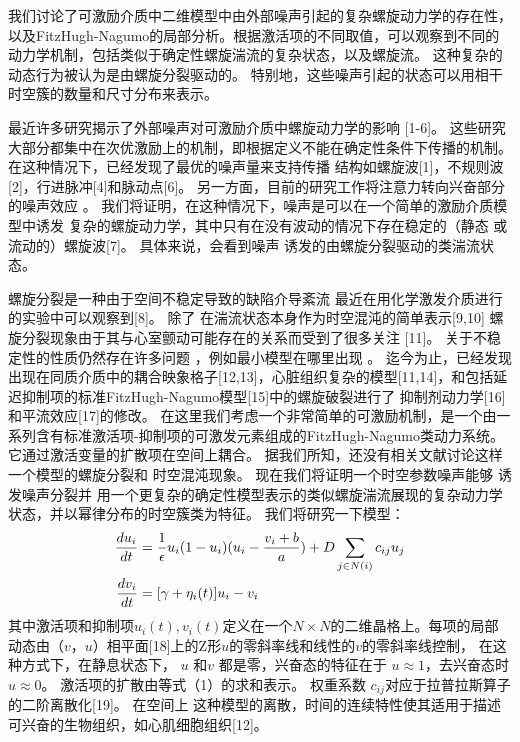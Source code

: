 \documentclass[
    bachelor,
    nofont, %
    pdflinks,
    ]{xjtuthesis}
\begin{document}

	我们讨论了可激励介质中⼆维模型中由外部噪声引起的复杂螺旋动⼒学的存在性，以及FitzHugh-Nagumo的局部分析。根据激活项的不同取值，可以观察到不同的动⼒学机制，包括类似于确定性螺旋湍流的复杂状态，以及螺旋流。 这种复杂的动态⾏为被认为是由螺旋分裂驱动的。 
特别地，这些噪声引起的状态可以⽤相⼲时空簇的数量和尺⼨分布来表示。 
	

最近许多研究揭⽰了外部噪声对可激励介质中螺旋动⼒学的影响
[1-6]。 这些研究⼤部分都集中在次优激励上的机制，即根据定义不能在确定性条件下传播的机制。在这种情况下，已经发现了最优的噪声量来⽀持传播
结构如螺旋波[1]，不规则波[2]，⾏进脉冲[4]和脉动点[6]。
另⼀⽅⾯，⽬前的研究⼯作将注意⼒转向兴奋部分的噪声效应
。 我们将证明，在这种情况下，噪声是可以在⼀个简单的激励介质模型中诱发
复杂的螺旋动⼒学，其中只有在没有波动的情况下存在稳定的（静态
或流动的）螺旋波[7]。 具体来说，会看到噪声
诱发的由螺旋分裂驱动的类湍流状态。

\medskip

螺旋分裂是⼀种由于空间不稳定导致的缺陷介导紊流
最近在⽤化学激发介质进⾏的实验中可以观察到[8]。 除了
在湍流状态本⾝作为时空混沌的简单表⽰[9,10]
螺旋分裂现象由于其与⼼室颤动可能存在的关系⽽受到了很多关注
[11]。 关于不稳定性的性质仍然存在许多问题
，例如最⼩模型在哪里出现
。 迄今为⽌，已经发现出现在同质介质中的耦合映象格子[12,13]，⼼脏组织复杂的模型[11,14]，和包括延迟抑制项的标准FitzHugh-Nagumo模型[15]中的螺旋破裂进⾏了
抑制剂动⼒学[16]和平流效应[17]的修改。 在这⾥我们考虑⼀个⾮常简单的可激励机制，是一个由⼀系列含有标准激活项-抑制项的可激发元素组成的FitzHugh-Nagumo类动⼒系统。它通过激活变量的扩散项在空间上耦合。
据我们所知，还没有相关文献讨论这样⼀个模型的螺旋分裂和
时空混沌现象。 现在我们将证明⼀个时空参数噪声能够
诱发噪声分裂并
用一个更复杂的确定性模型表示的类似螺旋湍流展现的复杂动⼒学状态，并以幂律分布的时空簇类为特征。
\medskip
我们将研究一下模型：
\begin{align}
\dfrac{du_i}{dt}&=\dfrac{1}{\epsilon}u_i(1-u_i)(u_i-\dfrac{v_i+b}{a})+D\sum_{j \in N(i)}c_{ij}u_j\\
\notag \dfrac{dv_i}{dt}&=[\gamma+\eta_i(t)]u_i-v_i
\end{align}
其中激活项和抑制项$u_i(t),v_i(t)$定义在一个$N\times N$的二维晶格上。每项的局部动态由$（ v，u ）$相平⾯[18]上的Z形$u$的零斜率线和线性的$v$的零斜率线控制，
在这种⽅式下，在静息状态下， $u$ 和$v$ 都是零，兴奋态的特征在于
$u \approx 1$，去兴奋态时$u \approx 0$。 激活项的扩散由等式（1）的求和表示。 权重系数
$c_{ij}$对应于拉普拉斯算⼦的⼆阶离散化[19]。 在空间上
这种模型的离散，时间的连续特性使其适⽤于描述
可兴奋的⽣物组织，如⼼肌细胞组织[12]。
\end{document}
